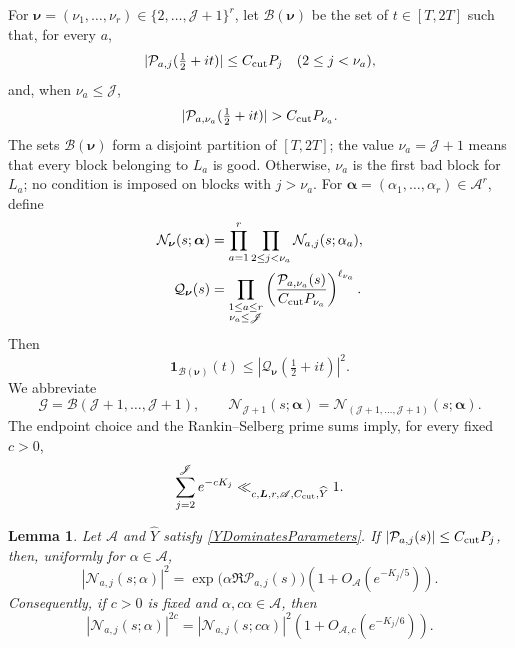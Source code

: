\documentclass[oneside, 12pt]{amsart}
\newtheorem{lem}[thm]{Lemma}
\theoremstyle{definition}
\begin{document}
{		For \(\boldsymbol\nu=(\nu_1,\ldots,\nu_r)\in
		\{2,\ldots,\mathscr J+1\}^r\), let
		\(\mathscr B(\boldsymbol\nu)\) be the set of \(t\in[T,2T]\) such that,
		for every \(a\),
		\[
		|\mathcal P_{a,j}(\tfrac12+it)|\leq C_{\rm cut}P_j
		\quad(2\leq j<\nu_a),
		\]
		and, when \(\nu_a\leq\mathscr J\),
		\[
		|\mathcal P_{a,\nu_a}(\tfrac12+it)|>C_{\rm cut}P_{\nu_a}.
		\]
		The sets \(\mathscr B(\boldsymbol\nu)\) form a disjoint partition of
		\([T,2T]\); the value \(\nu_a=\mathscr J+1\) means that every block
		belonging to \(L_a\) is good. Otherwise, $\nu_a$ is the first bad block
		for $L_a$; no condition is imposed on blocks with $j>\nu_a$. For
		\(\boldsymbol\alpha=(\alpha_1,\ldots,\alpha_r)\in\mathscr A^r\), define
		\begin{align}
			\mathcal N_{\boldsymbol\nu}(s;\boldsymbol\alpha)
			&=\prod_{a=1}^r\prod_{2\leq j<\nu_a}
			\mathcal N_{a,j}(s;\alpha_a),\label{truncatedVectorN}\\
			\mathcal Q_{\boldsymbol\nu}(s)
			&=\prod_{\substack{1\leq a\leq r\\\nu_a\leq\mathscr J}}
			\left(\frac{\mathcal P_{a,\nu_a}(s)}{C_{\rm cut}P_{\nu_a}}
			\right)^{\ell_{\nu_a}}.\label{badBlockPolynomial}
		\end{align}
		Then
		\[
		\mathbf1_{\mathscr B(\boldsymbol\nu)}(t)
		\leq|\mathcal Q_{\boldsymbol\nu}(\tfrac12+it)|^2.
		\]
		We abbreviate
		\[
		\mathscr G=\mathscr B(\mathscr J+1,\ldots,\mathscr J+1),
		\qquad
		\mathcal N_{\mathscr J+1}(s;\boldsymbol\alpha)
		=\mathcal N_{(\mathscr J+1,\ldots,\mathscr J+1)}
		(s;\boldsymbol\alpha).
		\]
		The endpoint choice and the Rankin--Selberg prime sums imply, for every
		fixed $c>0$,
		\begin{equation}\label{cutoffSummability}
			\sum_{j=2}^{\mathscr J}e^{-cK_j}
			\ll_{c,\boldsymbol L,r,\mathscr A,C_{\rm cut},\widehat Y}1.
		\end{equation}
		\begin{lem}\label{factorwiseExponentialLemma}
			Let $\mathscr A$ and $\widehat Y$ satisfy
			\eqref{YDominatesParameters}.
			If $|\mathcal P_{a,j}(s)|\leq C_{\rm cut}P_j$, then, uniformly for
			$\alpha\in\mathscr A$,
			\begin{equation}\label{factorwiseExponentialApproximation}
				|\mathcal N_{a,j}(s;\alpha)|^2
				=\exp\bigl(\alpha\Re\mathcal P_{a,j}(s)\bigr)
				\left(1+O_{\mathscr A}(e^{-K_j/5})\right).
			\end{equation}
			Consequently, if $c>0$ is fixed and $\alpha,c\alpha\in\mathscr A$, then
			\begin{equation}\label{moveRealPowerInside}
				|\mathcal N_{a,j}(s;\alpha)|^{2c}
				=|\mathcal N_{a,j}(s;c\alpha)|^2
				\left(1+O_{\mathscr A,c}(e^{-K_j/6})\right).
			\end{equation}
		\end{lem}
		
}
\end{document}
